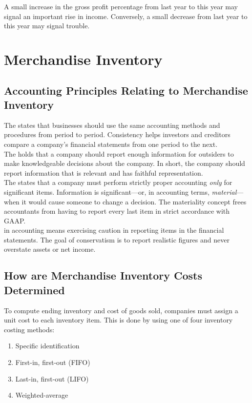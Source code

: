 \documentclass{article}
\begin{document}
\begin{remark}
  A small increase in the gross profit percentage from last year to this year may signal an important rise in income. Conversely, a small decrease from last year to this year may signal trouble. 
\end{remark}

\section{Merchandise Inventory}

\subsection{Accounting Principles Relating to Merchandise Inventory}

The  states that businesses should use the same accounting methods and procedures from period to period. Consistency helps investors and creditors compare a company's financial statements from one period to the next. \\ 

The  holds that a company should report enough information for outsiders to make knowledgeable decisions about the company. In short, the company should report information that is relevant and has faithful representation. \\ 

The  states that a company must perform strictly proper accounting \emph{only} for significant items. Information is significant---or, in accounting terms, \emph{material}---when it would cause someone to change a decision. The materiality concept frees accountants from having to report every last item in strict accordance with GAAP. \\ 

 in accounting means exercising caution in reporting items in the financial statements. The goal of conservatism is to report realistic figures and never overstate assets or net income. 

\subsection{How are Merchandise Inventory Costs Determined}

To compute ending inventory and cost of goods sold, companies must assign a unit cost to each inventory item. This is done by using one of four inventory costing methods: 
\begin{enumerate}
  \item Specific identification 
  \item First-in, first-out (FIFO)
  \item Last-in, first-out (LIFO) 
  \item Weighted-average
\end{enumerate}
\end{document}
